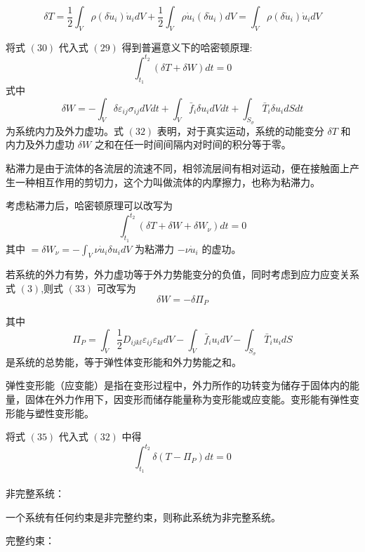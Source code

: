 \documentclass[12pt,a4paper]{article}
\begin{document}
$$
\delta T=\frac{1}{2}\int_{V}\rho(\delta\dot{u}_i)\dot{u}_idV+\frac{1}{2}\int_{V}\rho\dot{u}_i(\delta\dot{u}_i)dV=\int_{V}\rho(\delta\dot{u}_i)\dot{u}_idV
$$

将式 $(30)$ 代入式 $(29)$ 得到普遍意义下的哈密顿原理:
\begin{equation}
\int_{t_1}^{t_2} (\delta T+\delta W)dt=0
\end{equation}
式中
\begin{equation}
\delta W=-\int_{V}\delta\varepsilon_{ij}\sigma_{ij}dVdt+\int_{V}\bar{f}_i\delta u_idVdt+\int_{S_{\sigma}}\bar{T}_i\delta u_idSdt
\end{equation}
为系统内力及外力虚功。式 $(32)$ 表明，对于真实运动，系统的动能变分 $\delta T$ 和内力及外力虚功 $\delta W$ 之和在任一时间间隔内对时间的积分等于零。

粘滞力是由于流体的各流层的流速不同，相邻流层间有相对运动，便在接触面上产生一种相互作用的剪切力，这个力叫做流体的内摩擦力，也称为粘滞力。

考虑粘滞力后，哈密顿原理可以改写为
\begin{equation}
\int_{t_1}^{t_2} (\delta T+\delta W+\delta W_{\nu})dt=0
\end{equation}
其中 $=\delta W_{\nu}=-\int_{V}\nu\dot{u}_i\delta u_idV$ 为粘滞力 $-\nu\dot{u}_i$ 的虚功。

若系统的外力有势，外力虚功等于外力势能变分的负值，同时考虑到应力应变关系式 $(3)$,则式 $(33)$ 可改写为
\begin{equation}
\delta W=-\delta \Pi _P
\end{equation}

其中
\begin{equation}
\Pi _P=\int_{V}\frac{1}{2}D_{ijkl}\varepsilon_{ij}\varepsilon_{kl}dV-\int_{V}\bar{f}_iu_idV-\int_{S_{\sigma}}\bar{T}_iu_idS
\end{equation}
是系统的总势能，等于弹性体变形能和外力势能之和。

弹性变形能（应变能）是指在变形过程中，外力所作的功转变为储存于固体内的能量，固体在外力作用下，因变形而储存能量称为变形能或应变能。变形能有弹性变形能与塑性变形能。

将式 $(35)$ 代入式 $(32)$ 中得
\begin{equation}
\int_{t_1}^{t_2}\delta(T-\Pi _P)dt=0
\end{equation}\\


非完整系统：

一个系统有任何约束是非完整约束，则称此系统为非完整系统。

完整约束：
\end{document}

